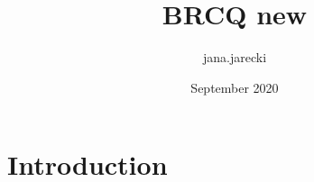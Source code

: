 \documentclass{article}
\title{BRCQ new}
\author{jana.jarecki }
\date{September 2020}
\begin{document}
\maketitle

\section{Introduction}
\end{document}
